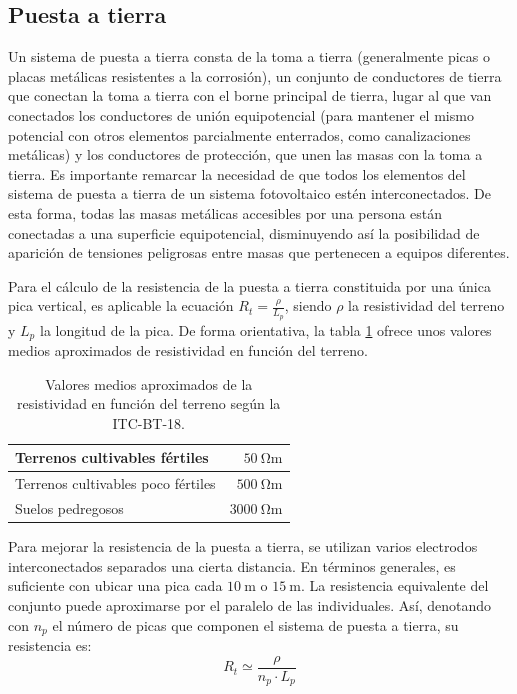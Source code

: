 \subsection{Puesta a tierra}
\label{sec:puesta_tierra}
Un sistema de puesta a tierra consta de la toma a tierra (generalmente
picas o placas metálicas resistentes a la corrosión), un conjunto
de conductores de tierra que conectan la toma a tierra con el borne
principal de tierra, lugar al que van conectados los conductores de
unión equipotencial (para mantener el mismo potencial con otros elementos
parcialmente enterrados, como canalizaciones metálicas) y los conductores
de protección, que unen las masas con la toma a tierra. Es importante
remarcar la necesidad de que todos los elementos del sistema de puesta
a tierra de un sistema fotovoltaico estén interconectados. De esta
forma, todas las masas metálicas accesibles por una persona están
conectadas a una superficie equipotencial, disminuyendo así la posibilidad
de aparición de tensiones peligrosas entre masas que pertenecen a
equipos diferentes.

Para el cálculo de la resistencia de la puesta a tierra constituida
por una única pica vertical, es aplicable la ecuación $R_{t}=\frac{\rho}{L_{p}}$,
siendo $\rho$ la resistividad del terreno y $L_{p}$
la longitud de la pica. De forma orientativa, la tabla \ref{tab:ValoresResistividad}
ofrece unos valores medios aproximados de resistividad en función
del terreno.

%
\begin{table}
\caption{Valores medios aproximados de la resistividad en función del terreno
según la ITC-BT-18.\label{tab:ValoresResistividad}}


\begin{tabular}{lr}
\toprule 
Terrenos cultivables fértiles & $\SI{50}{\ohm\meter}$\tabularnewline
\midrule 
Terrenos cultivables poco fértiles & $\SI{500}{\ohm\meter}$\tabularnewline
\midrule 
Suelos pedregosos & $\SI{3000}{\ohm\meter}$\tabularnewline
\bottomrule
\end{tabular}
\end{table}


Para mejorar la resistencia de la puesta a tierra, se utilizan varios
electrodos interconectados separados una cierta distancia. En términos
generales, es suficiente con ubicar una pica cada $\SI{10}{\meter}$
o $\SI{15}{\meter}$. La resistencia equivalente del conjunto puede
aproximarse por el paralelo de las individuales. Así, denotando con
$n_{p}$
el número de picas que componen el sistema de puesta a tierra, su
resistencia es:
\begin{equation}
R_{t} \simeq \frac{\rho}{n_{p}\cdot L_{p}}
\label{eq:Rtvariaspicas}
\end{equation}


